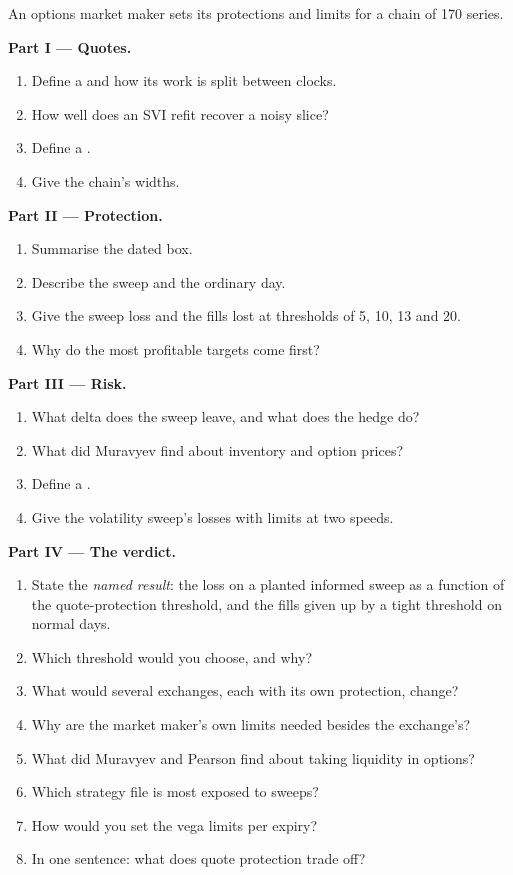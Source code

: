 \begin{problem}\label{pb:hf:automated-options-market-making:1}
An options market maker sets its protections and limits for a chain of 170 series.

\medskip\noindent\textbf{Part I --- Quotes.}
\begin{enumerate}
\item Define a  and how its work is split between clocks.
\item How well does an SVI refit recover a noisy slice?
\item Define a .
\item Give the chain's widths.
\end{enumerate}

\medskip\noindent\textbf{Part II --- Protection.}
\begin{enumerate}[resume]
\item Summarise the dated box.
\item Describe the sweep and the ordinary day.
\item Give the sweep loss and the fills lost at thresholds of 5, 10, 13 and 20.
\item Why do the most profitable targets come first?
\end{enumerate}

\medskip\noindent\textbf{Part III --- Risk.}
\begin{enumerate}[resume]
\item What delta does the sweep leave, and what does the hedge do?
\item What did Muravyev find about inventory and option prices?
\item Define a .
\item Give the volatility sweep's losses with limits at two speeds.
\end{enumerate}

\medskip\noindent\textbf{Part IV --- The verdict.}
\begin{enumerate}[resume]
\item State the \emph{named result}: the loss on a planted informed sweep as a function of the quote-protection threshold, and the fills given up by
a tight threshold on normal days.
\item Which threshold would you choose, and why?
\item What would several exchanges, each with its own protection, change?
\item Why are the market maker's own limits needed besides the exchange's?
\item What did Muravyev and Pearson find about taking liquidity in options?
\item Which strategy file is most exposed to sweeps?
\item How would you set the vega limits per expiry?
\item In one sentence: what does quote protection trade off?
\end{enumerate}
\end{problem}

